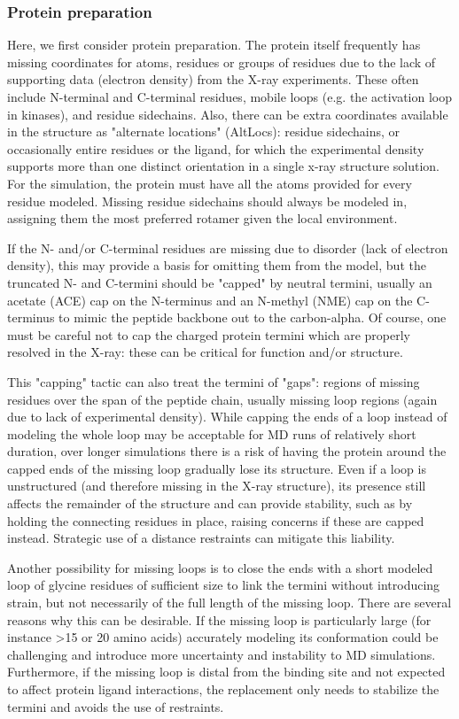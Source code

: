 \documentclass[9pt,bestpractices]{livecoms}
\begin{document}
\subsubsection{Protein preparation}

Here, we first consider protein preparation. The protein itself frequently has missing coordinates for atoms, residues or groups of residues due to the lack of supporting data (electron density) from the X-ray experiments. These often include N-terminal and C-terminal residues, mobile loops (e.g. the activation loop in kinases), and residue sidechains. Also, there can be extra coordinates available in the structure as "alternate locations" (AltLocs): residue sidechains, or occasionally entire residues or the ligand, for which the experimental density supports more than one distinct orientation in a single x-ray structure solution. For the simulation, the protein must have all the atoms provided for every residue modeled. Missing residue sidechains should always be modeled in, assigning them the most preferred rotamer given the local environment. 

If the N- and/or C-terminal residues are missing due to disorder (lack of electron density), this may provide a basis for omitting them from the model, but the truncated N- and C-termini should be "capped" by neutral termini, usually an acetate (ACE) cap on the N-terminus and an N-methyl (NME) cap on the C-terminus to mimic the peptide backbone out to the carbon-alpha. Of course, one must be careful not to cap the charged protein termini which are properly resolved in the X-ray: these can be critical for function and/or structure. 

This "capping" tactic can also treat the termini of "gaps": regions of missing residues over the span of the peptide chain, usually missing loop regions (again due to lack of experimental density). While capping the ends of a loop instead of modeling the whole loop may be acceptable for MD runs of relatively short duration, over longer simulations there is a risk of having the protein around the capped ends of the missing loop gradually lose its structure. Even if a loop is unstructured (and therefore missing in the X-ray structure), its presence still affects the remainder of the structure and can provide stability, such as by holding the connecting residues in place, raising concerns if these are capped instead. Strategic use of a distance restraints can mitigate this liability.

Another possibility for missing loops is to close the ends with a short modeled loop of glycine residues of sufficient size to link the termini without introducing strain, but not necessarily of the full length of the missing loop. There are several reasons why this can be desirable. If the missing loop is particularly large (for instance >15 or 20 amino acids) accurately modeling its conformation could be challenging and introduce more uncertainty and instability to MD simulations. Furthermore, if the missing loop is distal from the binding site and not expected to affect protein ligand interactions, the replacement only needs to stabilize the termini and avoids the use of restraints. 
\end{document}
